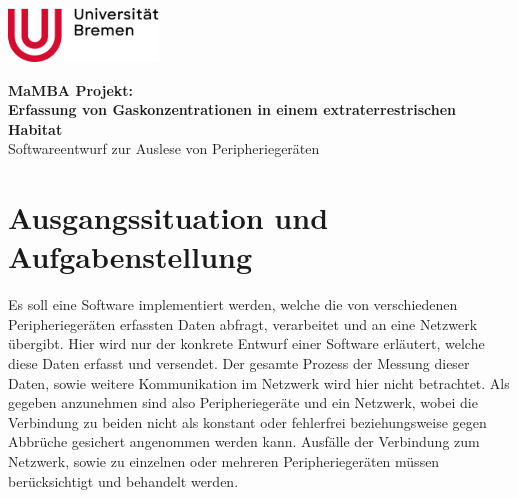 \documentclass[a4paper, 12pt]{article}
\begin{document}
\begin{multicols}{2}
\includegraphics[width=0.3\textwidth]{bilder/Uni-Bremen_Logo.png}
\\
\end{multicols}
\begin{center}
{\LARGE\bfseries MaMBA Projekt:\\Erfassung von Gaskonzentrationen in einem extraterrestrischen Habitat}
\\
{\Large Softwareentwurf zur Auslese von Peripheriegeräten}
\end{center}
\section{Ausgangssituation und Aufgabenstellung}
Es soll eine Software implementiert werden, welche die von verschiedenen Peripheriegeräten erfassten Daten abfragt, verarbeitet und an eine Netzwerk übergibt. Hier wird nur der konkrete Entwurf einer Software erläutert, welche diese Daten erfasst und versendet. Der gesamte Prozess der Messung dieser Daten, sowie weitere Kommunikation im Netzwerk wird hier nicht betrachtet. Als gegeben anzunehmen sind also Peripheriegeräte und ein Netzwerk, wobei die Verbindung zu beiden nicht als konstant oder fehlerfrei beziehungsweise gegen Abbrüche gesichert angenommen werden kann. Ausfälle der Verbindung zum Netzwerk, sowie zu einzelnen oder mehreren Peripheriegeräten müssen berücksichtigt und behandelt werden.\\
\end{document}
